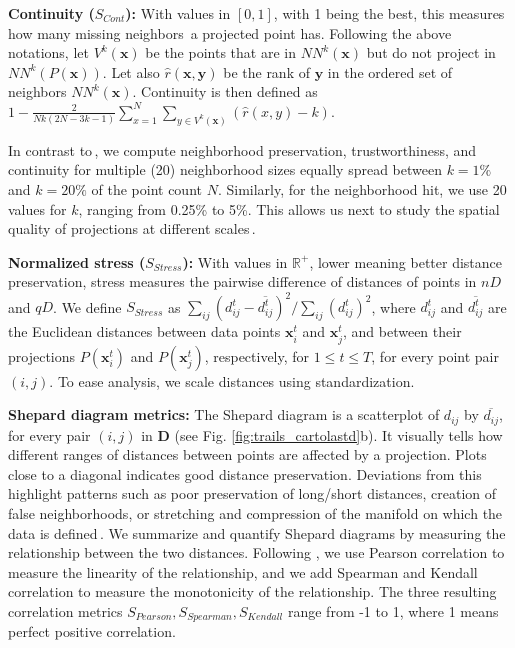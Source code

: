 \noindent
\textbf{Continuity ($S_{Cont}$):} With values in $[0,1]$, with 1 being the best, this measures how many missing neighbors\,\cite{Martins2014} a projected point has. Following the above notations, let $V^k(\mathbf{x})$
be the points that are in $NN^k(\mathbf{x})$ but do not project in $NN^k(P(\mathbf{x}))$. Let also $\hat{r}(\mathbf{x}, \mathbf{y})$ be the rank of $\mathbf{y}$ in the ordered set of neighbors $NN^k(\mathbf{x})$. Continuity is then defined as \linebreak
$1-\frac{2}{N k(2 N-3 k-1)} \sum_{x=1}^{N} \sum_{y \in V^k(\mathbf{x})}(\hat{r}(x, y)-k)$.

In contrast to\,\cite{EspadotoSurvey}, we compute neighborhood preservation, trustworthiness, and continuity for multiple (20) neighborhood sizes equally spread between $k=1\%$ and $k=20\%$ of the point count $N$. Similarly, for the neighborhood hit, we use 20 values for $k$, ranging from 0.25\% to 5\%. This allows us next to study the spatial quality of projections at different scales\,\cite{Martins2015}.

\noindent
\textbf{Normalized stress ($S_{Stress}$):} With values in $\mathbb{R}^{+}$, lower meaning better distance preservation, stress measures the pairwise difference of distances of points in $nD$ and $qD$. We define $S_{Stress}$ as  $\sum_{i j}\left(d_{i j}^t - \overline{d_{i j}^t}\right)^{2} / \sum_{i j} (d_{i j}^t)^{2}$,
where $d_{i j}^t$ and $\overline{d_{i j}^t}$ are the Euclidean distances between data points $\mathbf{x}_i^t$ and $\mathbf{x}_j^t$, and between their projections $P(\mathbf{x}_i^t)$ and $P(\mathbf{x}_j^t)$, respectively, for $1 \leq t \leq T$, for every point pair $(i,j)$. To ease analysis, we scale distances using standardization.

\noindent
\textbf{Shepard diagram metrics:} The Shepard diagram is a scatterplot of $d_{ij}$ by $\overline{d_{ij}}$, for every pair $(i,j)$ in $\mathbf{D}$ (see Fig. \ref{fig:trails_cartolastd}b). It visually tells how different ranges of distances between points are affected by a projection. Plots close to a diagonal indicates good distance preservation.
Deviations from this highlight patterns such as poor preservation of long/short distances, creation of false neighborhoods, or stretching and compression of the manifold on which the data is defined\,\cite{lamp}. We summarize and quantify Shepard diagrams by measuring the relationship between the two distances. Following \cite{EspadotoSurvey}, we use Pearson correlation to measure the linearity of the relationship, and we add Spearman and Kendall correlation to measure the monotonicity of the relationship. The three resulting correlation metrics $S_{Pearson}, S_{Spearman}, S_{Kendall}$ range from -1 to 1, where 1 means perfect positive correlation.

